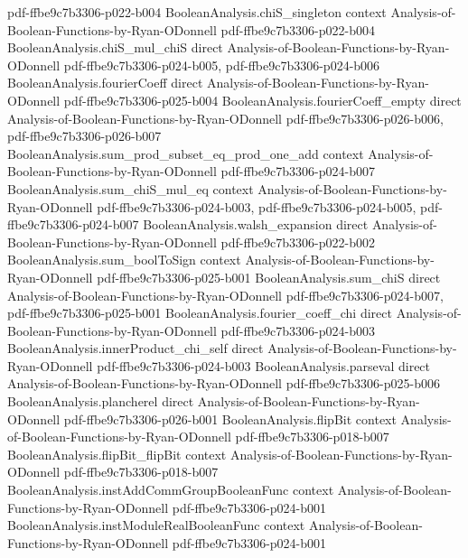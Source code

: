 \begin{theorem}
  {pdf-ffbe9c7b3306-p022-b004}
\proofstep
  {BooleanAnalysis.chiS_singleton}
  {context}
  {Analysis-of-Boolean-Functions-by-Ryan-ODonnell}
  {pdf-ffbe9c7b3306-p022-b004}
\proofstep
  {BooleanAnalysis.chiS_mul_chiS}
  {direct}
  {Analysis-of-Boolean-Functions-by-Ryan-ODonnell}
  {pdf-ffbe9c7b3306-p024-b005,
    pdf-ffbe9c7b3306-p024-b006}
\proofstep
  {BooleanAnalysis.fourierCoeff}
  {direct}
  {Analysis-of-Boolean-Functions-by-Ryan-ODonnell}
  {pdf-ffbe9c7b3306-p025-b004}
\proofstep
  {BooleanAnalysis.fourierCoeff_empty}
  {direct}
  {Analysis-of-Boolean-Functions-by-Ryan-ODonnell}
  {pdf-ffbe9c7b3306-p026-b006,
    pdf-ffbe9c7b3306-p026-b007}
\proofstep
  {BooleanAnalysis.sum_prod_subset_eq_prod_one_add}
  {context}
  {Analysis-of-Boolean-Functions-by-Ryan-ODonnell}
  {pdf-ffbe9c7b3306-p024-b007}
\proofstep
  {BooleanAnalysis.sum_chiS_mul_eq}
  {context}
  {Analysis-of-Boolean-Functions-by-Ryan-ODonnell}
  {pdf-ffbe9c7b3306-p024-b003,
    pdf-ffbe9c7b3306-p024-b005,
    pdf-ffbe9c7b3306-p024-b007}
\proofstep
  {BooleanAnalysis.walsh_expansion}
  {direct}
  {Analysis-of-Boolean-Functions-by-Ryan-ODonnell}
  {pdf-ffbe9c7b3306-p022-b002}
\proofstep
  {BooleanAnalysis.sum_boolToSign}
  {context}
  {Analysis-of-Boolean-Functions-by-Ryan-ODonnell}
  {pdf-ffbe9c7b3306-p025-b001}
\proofstep
  {BooleanAnalysis.sum_chiS}
  {direct}
  {Analysis-of-Boolean-Functions-by-Ryan-ODonnell}
  {pdf-ffbe9c7b3306-p024-b007,
    pdf-ffbe9c7b3306-p025-b001}
\proofstep
  {BooleanAnalysis.fourier_coeff_chi}
  {direct}
  {Analysis-of-Boolean-Functions-by-Ryan-ODonnell}
  {pdf-ffbe9c7b3306-p024-b003}
\proofstep
  {BooleanAnalysis.innerProduct_chi_self}
  {direct}
  {Analysis-of-Boolean-Functions-by-Ryan-ODonnell}
  {pdf-ffbe9c7b3306-p024-b003}
\proofstep
  {BooleanAnalysis.parseval}
  {direct}
  {Analysis-of-Boolean-Functions-by-Ryan-ODonnell}
  {pdf-ffbe9c7b3306-p025-b006}
\proofstep
  {BooleanAnalysis.plancherel}
  {direct}
  {Analysis-of-Boolean-Functions-by-Ryan-ODonnell}
  {pdf-ffbe9c7b3306-p026-b001}
\proofstep
  {BooleanAnalysis.flipBit}
  {context}
  {Analysis-of-Boolean-Functions-by-Ryan-ODonnell}
  {pdf-ffbe9c7b3306-p018-b007}
\proofstep
  {BooleanAnalysis.flipBit_flipBit}
  {context}
  {Analysis-of-Boolean-Functions-by-Ryan-ODonnell}
  {pdf-ffbe9c7b3306-p018-b007}
\proofstep
  {BooleanAnalysis.instAddCommGroupBooleanFunc}
  {context}
  {Analysis-of-Boolean-Functions-by-Ryan-ODonnell}
  {pdf-ffbe9c7b3306-p024-b001}
\proofstep
  {BooleanAnalysis.instModuleRealBooleanFunc}
  {context}
  {Analysis-of-Boolean-Functions-by-Ryan-ODonnell}
  {pdf-ffbe9c7b3306-p024-b001}
\proofstep

\end{theorem}
